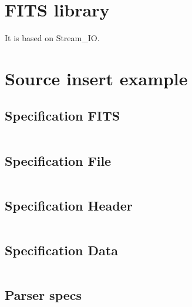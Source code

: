 \documentclass[a4paper,10pt]{article}
\begin{document}
\tableofcontents

\section{FITS library}

It is based on Stream\_IO.

\section{Source insert example}

\subsection{Specification FITS}
\inputminted{ada}{../lib/src/fits.ads}

\subsection{Specification File}
\inputminted{ada}{../lib/src/fits-file.ads}

\subsection{Specification Header}
\inputminted{ada}{../lib/src/fits-header.ads}

\subsection{Specification Data}
\inputminted{ada}{../lib/src/fits-data.ads}

\subsection{Parser specs}
\inputminted{ada}{../lib/src/fits-parser.ads}






\end{document}
